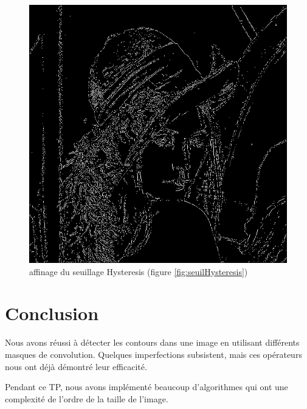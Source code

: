 \documentclass[11pt]{article}
\begin{document}
		\begin{figure}[H]
			\centering
			\includegraphics[scale=0.25]{Image/affinage.png}
			\caption{affinage du seuillage Hysteresis (figure \ref{fig:seuilHysteresis})}
			\label{fig:affinage}
		\end{figure} 

\section{Conclusion}

	Nous avons réussi à détecter les contours dans une image en utilisant différents masques de convolution. 
	Quelques imperfections subsistent, mais ces opérateurs nous ont déjà démontré leur efficacité. 

	Pendant ce TP, nous avons implémenté beaucoup d’algorithmes qui ont une complexité de l’ordre de la taille de l’image. 
\end{document}
